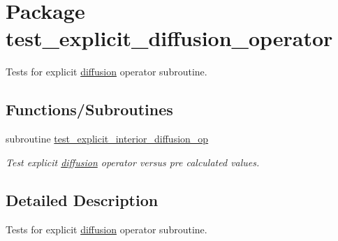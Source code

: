 \hypertarget{a00084}{
\section{Package test\_\-explicit\_\-diffusion\_\-operator}
\label{a00084}
}
Tests for explicit \hyperlink{a00056}{diffusion} operator subroutine.  


\subsection*{Functions/Subroutines}
\begin{CompactItemize}
\item 
\hypertarget{a00084_2e4a9afc85dd7bd915453d5252c4477c}{
subroutine \hyperlink{a00084_2e4a9afc85dd7bd915453d5252c4477c}{test\_\-explicit\_\-interior\_\-diffusion\_\-op}}
\label{a00084_2e4a9afc85dd7bd915453d5252c4477c}

\begin{CompactList}\small\item\em Test explicit \hyperlink{a00056}{diffusion} operator versus pre calculated values. \item\end{CompactList}\end{CompactItemize}


\subsection{Detailed Description}
Tests for explicit \hyperlink{a00056}{diffusion} operator subroutine. 

